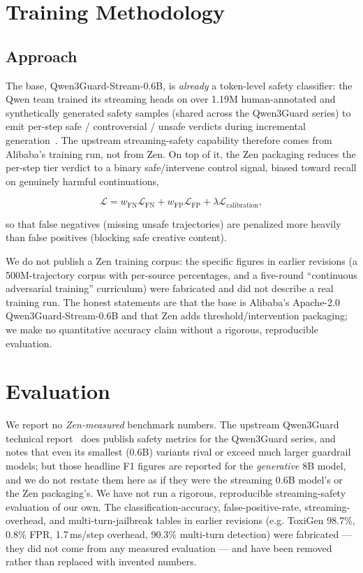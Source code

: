 \documentclass[11pt,a4paper]{article}
\begin{document}
\section{Training Methodology}

\subsection{Approach}

The base, Qwen3Guard-Stream-0.6B, is \emph{already} a token-level safety classifier: the Qwen
team trained its streaming heads on over 1.19M human-annotated and synthetically generated
safety samples (shared across the Qwen3Guard series) to emit per-step safe / controversial /
unsafe verdicts during incremental generation~\cite{qwen3guard}. The upstream streaming-safety
capability therefore comes from Alibaba's training run, not from Zen. On top of it, the Zen
packaging reduces the per-step tier verdict to a binary safe/intervene control signal, biased
toward recall on genuinely harmful continuations,

\begin{equation}
  \mathcal{L} = w_{\text{FN}} \mathcal{L}_{\text{FN}} + w_{\text{FP}} \mathcal{L}_{\text{FP}} + \lambda \mathcal{L}_{\text{calibration}},
\end{equation}

so that false negatives (missing unsafe trajectories) are penalized more heavily than false
positives (blocking safe creative content).

We do not publish a Zen training corpus: the specific figures in earlier revisions (a
500M-trajectory corpus with per-source percentages, and a five-round ``continuous adversarial
training'' curriculum) were fabricated and did not describe a real training run. The honest
statements are that the base is Alibaba's Apache-2.0 Qwen3Guard-Stream-0.6B and that Zen adds
threshold/intervention packaging; we make no quantitative accuracy claim without a rigorous,
reproducible evaluation.

\section{Evaluation}

We report no \emph{Zen-measured} benchmark numbers. The upstream Qwen3Guard technical
report~\cite{qwen3guard} does publish safety metrics for the Qwen3Guard series, and notes that
even its smallest (0.6B) variants rival or exceed much larger guardrail models; but those
headline F1 figures are reported for the \emph{generative} 8B model, and we do not restate them
here as if they were the streaming 0.6B model's or the Zen packaging's. We have not run a
rigorous, reproducible streaming-safety evaluation of our own. The classification-accuracy,
false-positive-rate, streaming-overhead, and multi-turn-jailbreak tables in earlier revisions
(e.g. ToxiGen 98.7\%, 0.8\% FPR, 1.7\,ms/step overhead, 90.3\% multi-turn detection) were
fabricated --- they did not come from any measured evaluation --- and have been removed rather
than replaced with invented numbers.
\end{document}

